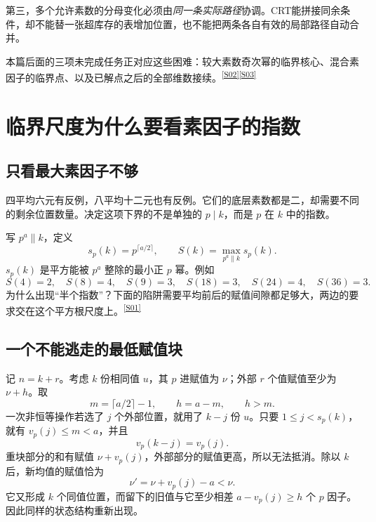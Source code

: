 \documentclass[11pt,a4paper,oneside,openany]{book}
\newcommand{\src}[1]{\textsuperscript{\hyperref[source:#1]{[#1]}}}
\theoremstyle{definition}\newtheorem{example}[theorem]{例}\newtheorem{conjecture}[theorem]{猜想}
\numberwithin{equation}{chapter}\setcounter{tocdepth}{1}
\begin{document}
第三，多个允许素数的分母变化必须由\emph{同一条实际路径}协调。CRT能拼接同余条件，却不能替一张超库存的表增加位置，也不能把两条各自有效的局部路径自动合并。

本篇后面的三项未完成任务正对应这些困难：较大素数奇次幂的临界核心、混合素因子的临界点、以及已解点之后的全部维数接续。\src{S02}\src{S03}


\chapter{临界尺度为什么要看素因子的指数}\label{ch:lower}
\section{只看最大素因子不够}
四平均六元有反例，八平均十二元也有反例。它们的底层素数都是二，却需要不同的剩余位置数量。决定这项下界的不是单独的 $p\mid k$，而是 $p$ 在 $k$ 中的指数。

写 $p^a\parallel k$，定义
\begin{equation}\label{eq:S}
s_p(k)=p^{\lceil a/2\rceil},\qquad S(k)=\max_{p^a\parallel k}s_p(k).
\end{equation}
$s_p(k)$ 是平方能被 $p^a$ 整除的最小正 $p$ 幂。例如
\[
S(4)=2,\quad S(8)=4,\quad S(9)=3,\quad
S(18)=3,\quad S(24)=4,\quad S(36)=3.
\]
为什么出现“半个指数”？下面的陷阱需要平均前后的赋值间隙都足够大，两边的要求交在这个平方根尺度上。\src{S01}

\section{一个不能逃走的最低赋值块}
记 $n=k+r$。考虑 $k$ 份相同值 $u$，其 $p$ 进赋值为 $\nu$；外部 $r$ 个值赋值至少为 $\nu+h$。取
\[m=\lceil a/2\rceil-1,\qquad h=a-m,\qquad h>m.
\]
一次非恒等操作若选了 $j$ 个外部位置，就用了 $k-j$ 份 $u$。只要 $1\le j<s_p(k)$，就有 $v_p(j)\le m<a$，并且
\[v_p(k-j)=v_p(j).
\]
重块部分的和有赋值 $\nu+v_p(j)$，外部部分的赋值更高，所以无法抵消。除以 $k$ 后，新均值的赋值恰为
\begin{equation}\label{eq:valuation-drop}
\nu'=\nu+v_p(j)-a<\nu.
\end{equation}
它又形成 $k$ 个同值位置，而留下的旧值与它至少相差 $a-v_p(j)\ge h$ 个 $p$ 因子。因此同样的状态结构重新出现。
\end{document}
